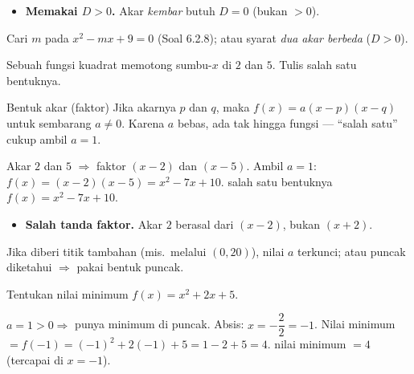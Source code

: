 \begin{jebakan}
\begin{itemize}[leftmargin=*,topsep=2pt]
  \item \textbf{Memakai $D>0$.} Akar \emph{kembar} butuh $D=0$ (bukan $>0$).
\end{itemize}
\end{jebakan}

\begin{variasi}
Cari $m$ pada $x^2-mx+9=0$ (Soal 6.2.8); atau syarat \emph{dua akar berbeda}
($D>0$).
\end{variasi}

\begin{soalbox}{}
Sebuah fungsi kuadrat memotong sumbu-$x$ di $2$ dan $5$. Tulis salah satu
bentuknya.
\end{soalbox}

\begin{ingat}{Bentuk akar (faktor)}
Jika akarnya $p$ dan $q$, maka $f(x)=a(x-p)(x-q)$ untuk sembarang $a\neq0$.
Karena $a$ bebas, ada tak hingga fungsi --- ``salah satu'' cukup ambil $a=1$.
\end{ingat}

\jawab
{} Akar $2$ dan $5$ $\Rightarrow$ faktor $(x-2)$ dan $(x-5)$.
 Ambil $a=1$: $f(x)=(x-2)(x-5)=x^2-7x+10$.
\jadi salah satu bentuknya $f(x)=x^2-7x+10$.

\begin{jebakan}
\begin{itemize}[leftmargin=*,topsep=2pt]
  \item \textbf{Salah tanda faktor.} Akar $2$ berasal dari $(x-2)$, bukan
  $(x+2)$.
\end{itemize}
\end{jebakan}

\begin{variasi}
Jika diberi titik tambahan (mis.\ melalui $(0,20)$), nilai $a$ terkunci; atau
puncak diketahui $\Rightarrow$ pakai bentuk puncak.
\end{variasi}

\begin{soalbox}{}
Tentukan nilai minimum $f(x)=x^2+2x+5$.
\end{soalbox}

\jawab
{} $a=1>0\Rightarrow$ punya minimum di puncak. Absis:
$x=-\dfrac{2}{2}=-1$.
 Nilai minimum $=f(-1)=(-1)^2+2(-1)+5=1-2+5=4$.
\jadi nilai minimum $=4$ (tercapai di $x=-1$).

